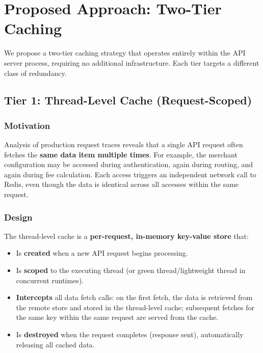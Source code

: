 \documentclass[12pt,a4paper]{report}
\begin{document}
\chapter{Proposed Approach: Two-Tier Caching}

We propose a two-tier caching strategy that operates entirely within the API server process, requiring no additional infrastructure. Each tier targets a different class of redundancy.

\section{Tier 1: Thread-Level Cache (Request-Scoped)}

\subsection{Motivation}

Analysis of production request traces reveals that a single API request often fetches the \textbf{same data item multiple times}. For example, the merchant configuration may be accessed during authentication, again during routing, and again during fee calculation. Each access triggers an independent network call to Redis, even though the data is identical across all accesses within the same request.

\subsection{Design}

The thread-level cache is a \textbf{per-request, in-memory key-value store} that:

\begin{itemize}
    \item Is \textbf{created} when a new API request begins processing.
    \item Is \textbf{scoped} to the executing thread (or green thread/lightweight thread in concurrent runtimes).
    \item \textbf{Intercepts} all data fetch calls: on the first fetch, the data is retrieved from the remote store and stored in the thread-level cache; subsequent fetches for the same key within the same request are served from the cache.
    \item Is \textbf{destroyed} when the request completes (response sent), automatically releasing all cached data.
\end{itemize}
\end{document}
